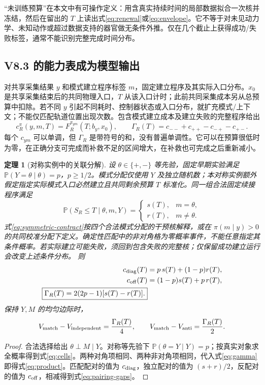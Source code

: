 \documentclass[11pt,a4paper,fontset=fandol]{ctexart}
\newtheorem{theorem}{定理}[section]
\theoremstyle{definition}
\theoremstyle{remark}
\numberwithin{equation}{section}
\newcommand{\Pp}{\mathbb P}
\begin{document}
“未训练预算”在本文中有可操作定义：用含真实持续时间的局部数据拟合一次核并冻结，然后在留出的 $T$ 上读出式\eqref{eq:renewal}或\eqref{eq:envelope}。它不等于对未见动力学、未知动作或超过数据支持的器官做无条件外推。仅在几个截止上获得成功/失败标签，通常不能识别完整完成时间分布。

\subsection{V8.3 的能力表成为模型输出}
对共享采集结果 $y$ 和模式建立程序标签 $m$，固定建立程序及其实际入口分布。$x_0$ 是共享采集结束后的共同物理入口，$T$ 从该入口计时；此前共同采集成本另从总预算中扣除。若不同 $y$ 引起不同耗时、控制器状态或入口分布，就扩充模式/上下文；不能仅匹配轨道位置出现次数。包含模式建立成本及建立失败的完整程序给出
\begin{equation}
 c_R^\pi(y,m,T)=F_R^{\pi_{ym}}(T;b_y,x_0),\qquad
 \Gamma_R(T)=c_{--}+c_{++}-c_{-+}-c_{+-}.
 \label{eq:gamma}
\end{equation}
每个 $c_{ym}$ 可以单调，但 $\Gamma_R$ 是带符号的和，没有普遍单调性。它可以在预算很低时为零，在正确分支可完成而补救不足的区间增大，在补救也可完成之后重新减小。

\begin{theorem}[对称实例中的关联分解]
\label{thm:product}
设 $\theta\in\{+,-\}$ 等先验，固定早期实验满足 $\Pp(Y=\theta\mid\theta)=p$，$p\ge1/2$。模式分配仅使用 $Y$ 及独立随机数；本对称实例额外假定指定实际模式入口必然建立且共同剩余预算 $T$ 标准化。同一组合法固定续接程序满足
\begin{equation}
 \Pp(S_R\le T\mid\theta,m,Y)=
 \begin{cases}
 s(T),&m=\theta,\\
 r(T),&m\ne\theta.
 \end{cases}
 \label{eq:symmetric-contract}
\end{equation}
式\eqref{eq:symmetric-contract}按四个合法模式分配的干预核解释，或在 $\pi(m\mid y)>0$ 的共同校准分配下定义。确定性匹配中的非对角格为零概率事件，不能任意指定其条件概率。若实际建立可能失败，须回到包含失败的完整核；仅保留成功建立运行会改变上述条件分布。
则
\begin{align}
 c_{\rm diag}(T)&=p\,s(T)+(1-p)r(T),\nonumber\\
 c_{\rm off}(T)&=(1-p)s(T)+p\,r(T),\label{eq:cells}\\
 \boxed{\Gamma_R(T)=2(2p-1)[s(T)-r(T)].}\label{eq:product}
\end{align}
保持 $Y,M$ 的均匀边际时，
\begin{equation}
 V_{\rm match}-V_{\rm independent}=\frac{\Gamma_R(T)}4,\qquad
 V_{\rm match}-V_{\rm anti}=\frac{\Gamma_R(T)}2.
 \label{eq:pairing-gaps}
\end{equation}
\end{theorem}
\begin{proof}
合法选择给出 $\theta\perp M\mid Y$。对称等先验下 $\Pp(\theta=Y\mid Y)=p$；按真实对象求全概率得到式\eqref{eq:cells}。两种对角项相同、两种非对角项相同，代入式\eqref{eq:gamma}即得式\eqref{eq:product}。匹配配对的值为 $c_{\rm diag}$，独立配对的值为 $(s+r)/2$，反配对的值为 $c_{\rm off}$，相减得到式\eqref{eq:pairing-gaps}。
\end{proof}
\end{document}
